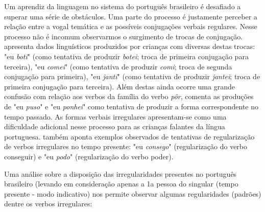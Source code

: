 Um aprendiz da linguagem no sistema do português brasileiro é desafiado a superar uma série de obstáculos.  Uma parte do processo é justamente perceber a relação entre a vogal temática e as possíveis conjugações verbais regulares. Nesse processo não é incomum observarmos o surgimento de trocas de conjugação. \cite{wuerges:2014} apresenta dados linguísticos produzidos por crianças com diversas destas trocas: "eu \textit{boti}" (como tentativa de produzir \textit{botei}; troca de primeira conjugação para terceira), "eu \textit{comei}" (como tentativa de produzir \textit{comi}; troca de segunda conjugação para primeira), "eu \textit{janti}" (como tentativa de produzir \textit{jantei}; troca de primeira conjugação para terceira). Além destas ainda ocorre uma grande confusão com relação aos verbos da família do verbo \textit{pôr}, \cite{wuerges:2014} comenta as produções de "eu \textit{puso}" e "eu \textit{ponhei}" como tentativa de produzir a forma correspondente no tempo passado.  As formas verbais irregulares apresentam-se como uma dificuldade adicional nesse processo para as crianças falantes da língua portuguesa. \cite{wuerges:2014} também aponta exemplos observados de tentativas de regularização de verbos irregulares no tempo presente: "eu \textit{consego}" (regularização do verbo conseguir) e "eu \textit{podo}" (regularização do verbo poder). 


Uma análise sobre a disposição das irregularidades presentes no português brasileiro (levando em consideração apenas a 1a pessoa do singular (tempo presente - modo indicativo) nos permite observar algumas regularidades (padrões) dentre os verbos irregulares:\\


